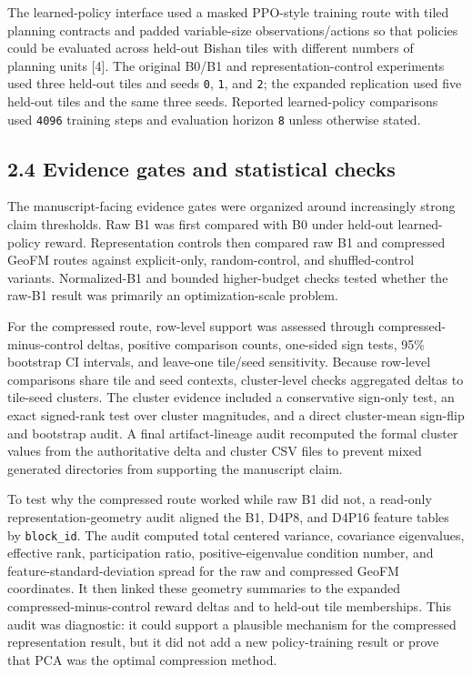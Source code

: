 \documentclass[
  11pt,
  a4paper,
]{article}
\begin{document}
The learned-policy interface used a masked PPO-style training route with
tiled planning contracts and padded variable-size observations/actions
so that policies could be evaluated across held-out Bishan tiles with
different numbers of planning units {[}4{]}. The original B0/B1 and
representation-control experiments used three held-out tiles and seeds
\texttt{0}, \texttt{1}, and \texttt{2}; the expanded replication used
five held-out tiles and the same three seeds. Reported learned-policy
comparisons used \texttt{4096} training steps and evaluation horizon
\texttt{8} unless otherwise stated.

\subsection{2.4 Evidence gates and statistical
checks}\label{evidence-gates-and-statistical-checks}

The manuscript-facing evidence gates were organized around increasingly
strong claim thresholds. Raw B1 was first compared with B0 under
held-out learned-policy reward. Representation controls then compared
raw B1 and compressed GeoFM routes against explicit-only,
random-control, and shuffled-control variants. Normalized-B1 and bounded
higher-budget checks tested whether the raw-B1 result was primarily an
optimization-scale problem.

For the compressed route, row-level support was assessed through
compressed-minus-control deltas, positive comparison counts, one-sided
sign tests, 95\% bootstrap CI intervals, and leave-one tile/seed
sensitivity. Because row-level comparisons share tile and seed contexts,
cluster-level checks aggregated deltas to tile-seed clusters. The
cluster evidence included a conservative sign-only test, an exact
signed-rank test over cluster magnitudes, and a direct cluster-mean
sign-flip and bootstrap audit. A final artifact-lineage audit recomputed
the formal cluster values from the authoritative delta and cluster CSV
files to prevent mixed generated directories from supporting the
manuscript claim.

To test why the compressed route worked while raw B1 did not, a
read-only representation-geometry audit aligned the B1, D4P8, and D4P16
feature tables by \texttt{block\_id}. The audit computed total centered
variance, covariance eigenvalues, effective rank, participation ratio,
positive-eigenvalue condition number, and feature-standard-deviation
spread for the raw and compressed GeoFM coordinates. It then linked
these geometry summaries to the expanded compressed-minus-control reward
deltas and to held-out tile memberships. This audit was diagnostic: it
could support a plausible mechanism for the compressed representation
result, but it did not add a new policy-training result or prove that
PCA was the optimal compression method.
\end{document}
